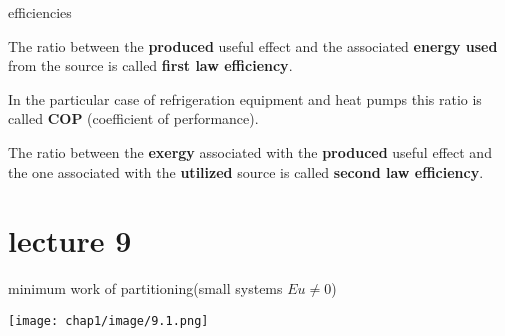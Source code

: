 \begin{defn}
    efficiencies

    The ratio between the \textbf{produced} useful effect and the associated 
    \textbf{energy used} from the source is called \textbf{first law efficiency}. 

In the particular case 
of refrigeration equipment and heat pumps this ratio is called \textbf{COP} (coefficient of
 performance).

 The ratio between the \textbf{exergy} associated with the \textbf{produced} useful effect and the 
 one associated with the  \textbf{utilized} source is called \textbf{second law efficiency}.
\end{defn}
\section{lecture 9}
\begin{defn}
    minimum work of partitioning(small systems \(Eu\neq 0\))
    \begin{center}
        \texttt{[image: chap1/image/9.1.png]}
    \end{center}
\end{defn}
